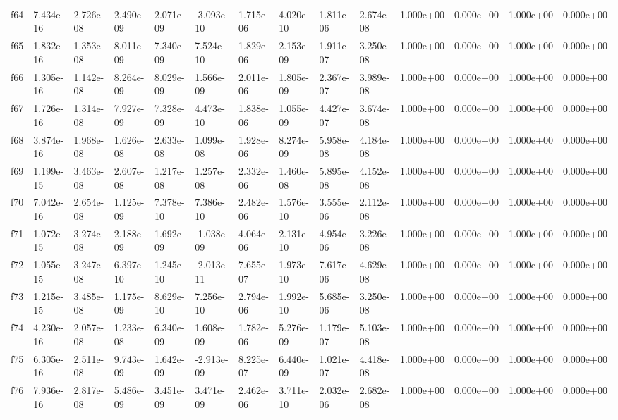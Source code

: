 \begin{table}
\begin{tabular}{llllllllllllll}
f64 & 7.434e-16 & 2.726e-08 & 2.490e-09 & 2.071e-09 & -3.093e-10 & 1.715e-06 & 4.020e-10 & 1.811e-06 & 2.674e-08 & 1.000e+00 & 0.000e+00 & 1.000e+00 & 0.000e+00 \\
f65 & 1.832e-16 & 1.353e-08 & 8.011e-09 & 7.340e-09 & 7.524e-10 & 1.829e-06 & 2.153e-09 & 1.911e-07 & 3.250e-08 & 1.000e+00 & 0.000e+00 & 1.000e+00 & 0.000e+00 \\
f66 & 1.305e-16 & 1.142e-08 & 8.264e-09 & 8.029e-09 & 1.566e-09 & 2.011e-06 & 1.805e-09 & 2.367e-07 & 3.989e-08 & 1.000e+00 & 0.000e+00 & 1.000e+00 & 0.000e+00 \\
f67 & 1.726e-16 & 1.314e-08 & 7.927e-09 & 7.328e-09 & 4.473e-10 & 1.838e-06 & 1.055e-09 & 4.427e-07 & 3.674e-08 & 1.000e+00 & 0.000e+00 & 1.000e+00 & 0.000e+00 \\
f68 & 3.874e-16 & 1.968e-08 & 1.626e-08 & 2.633e-08 & 1.099e-08 & 1.928e-06 & 8.274e-09 & 5.958e-08 & 4.184e-08 & 1.000e+00 & 0.000e+00 & 1.000e+00 & 0.000e+00 \\
f69 & 1.199e-15 & 3.463e-08 & 2.607e-08 & 1.217e-08 & 1.257e-08 & 2.332e-06 & 1.460e-08 & 5.895e-08 & 4.152e-08 & 1.000e+00 & 0.000e+00 & 1.000e+00 & 0.000e+00 \\
f70 & 7.042e-16 & 2.654e-08 & 1.125e-09 & 7.378e-10 & 7.386e-10 & 2.482e-06 & 1.576e-10 & 3.555e-06 & 2.112e-08 & 1.000e+00 & 0.000e+00 & 1.000e+00 & 0.000e+00 \\
f71 & 1.072e-15 & 3.274e-08 & 2.188e-09 & 1.692e-09 & -1.038e-09 & 4.064e-06 & 2.131e-10 & 4.954e-06 & 3.226e-08 & 1.000e+00 & 0.000e+00 & 1.000e+00 & 0.000e+00 \\
f72 & 1.055e-15 & 3.247e-08 & 6.397e-10 & 1.245e-10 & -2.013e-11 & 7.655e-07 & 1.973e-10 & 7.617e-06 & 4.629e-08 & 1.000e+00 & 0.000e+00 & 1.000e+00 & 0.000e+00 \\
f73 & 1.215e-15 & 3.485e-08 & 1.175e-09 & 8.629e-10 & 7.256e-10 & 2.794e-06 & 1.992e-10 & 5.685e-06 & 3.250e-08 & 1.000e+00 & 0.000e+00 & 1.000e+00 & 0.000e+00 \\
f74 & 4.230e-16 & 2.057e-08 & 1.233e-08 & 6.340e-09 & 1.608e-09 & 1.782e-06 & 5.276e-09 & 1.179e-07 & 5.103e-08 & 1.000e+00 & 0.000e+00 & 1.000e+00 & 0.000e+00 \\
f75 & 6.305e-16 & 2.511e-08 & 9.743e-09 & 1.642e-09 & -2.913e-09 & 8.225e-07 & 6.440e-09 & 1.021e-07 & 4.418e-08 & 1.000e+00 & 0.000e+00 & 1.000e+00 & 0.000e+00 \\
f76 & 7.936e-16 & 2.817e-08 & 5.486e-09 & 3.451e-09 & 3.471e-09 & 2.462e-06 & 3.711e-10 & 2.032e-06 & 2.682e-08 & 1.000e+00 & 0.000e+00 & 1.000e+00 & 0.000e+00 \\

\end{tabular}
\end{table}
